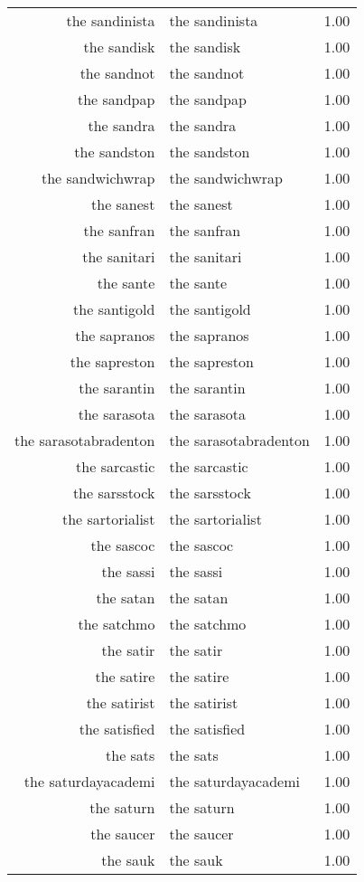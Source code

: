 \begin{table}[ht]
\begin{tabular}{rlr}
  the sandinista & the sandinista & 1.00 \\ 
  the sandisk & the sandisk & 1.00 \\ 
  the sandnot & the sandnot & 1.00 \\ 
  the sandpap & the sandpap & 1.00 \\ 
  the sandra & the sandra & 1.00 \\ 
  the sandston & the sandston & 1.00 \\ 
  the sandwichwrap & the sandwichwrap & 1.00 \\ 
  the sanest & the sanest & 1.00 \\ 
  the sanfran & the sanfran & 1.00 \\ 
  the sanitari & the sanitari & 1.00 \\ 
  the sante & the sante & 1.00 \\ 
  the santigold & the santigold & 1.00 \\ 
  the sapranos & the sapranos & 1.00 \\ 
  the sapreston & the sapreston & 1.00 \\ 
  the sarantin & the sarantin & 1.00 \\ 
  the sarasota & the sarasota & 1.00 \\ 
  the sarasotabradenton & the sarasotabradenton & 1.00 \\ 
  the sarcastic & the sarcastic & 1.00 \\ 
  the sarsstock & the sarsstock & 1.00 \\ 
  the sartorialist & the sartorialist & 1.00 \\ 
  the sascoc & the sascoc & 1.00 \\ 
  the sassi & the sassi & 1.00 \\ 
  the satan & the satan & 1.00 \\ 
  the satchmo & the satchmo & 1.00 \\ 
  the satir & the satir & 1.00 \\ 
  the satire & the satire & 1.00 \\ 
  the satirist & the satirist & 1.00 \\ 
  the satisfied & the satisfied & 1.00 \\ 
  the sats & the sats & 1.00 \\ 
  the saturdayacademi & the saturdayacademi & 1.00 \\ 
  the saturn & the saturn & 1.00 \\ 
  the saucer & the saucer & 1.00 \\ 
  the sauk & the sauk & 1.00 \\ 

\end{tabular}
\end{table}
